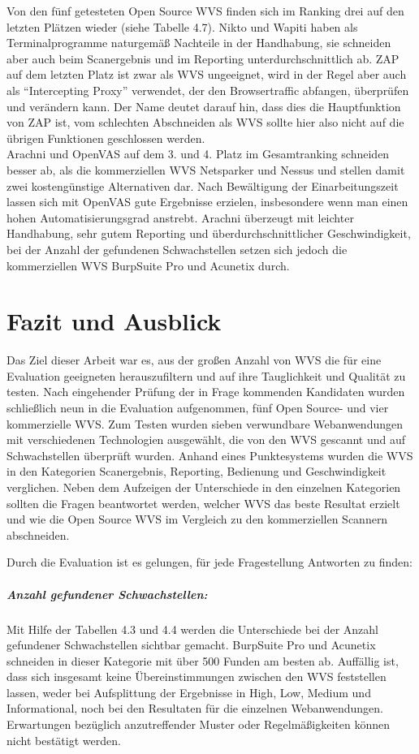 \documentclass[12pt,oneside,a4paper,parskip,pointlessnumbers]{scrbook}
\begin{document}
  Von den fünf getesteten Open Source WVS finden sich im Ranking drei auf den letzten Plätzen wieder (siehe Tabelle 4.7). Nikto und Wapiti haben als Terminalprogramme naturgemäß Nachteile in der Handhabung, sie schneiden aber auch beim Scanergebnis und im Reporting unterdurchschnittlich ab. ZAP auf dem letzten Platz ist zwar als WVS ungeeignet, wird in der Regel aber auch als ``Intercepting Proxy'' verwendet, der den Browsertraffic abfangen, überprüfen und verändern kann. Der Name deutet darauf hin, dass dies die Hauptfunktion von ZAP ist, vom schlechten Abschneiden als WVS sollte hier also nicht auf die übrigen Funktionen geschlossen werden.\\
  Arachni und OpenVAS auf dem 3. und 4. Platz im Gesamtranking schneiden besser ab, als die kommerziellen WVS Netsparker und Nessus und stellen damit zwei kostengünstige Alternativen dar. Nach Bewältigung der Einarbeitungszeit lassen sich mit OpenVAS gute Ergebnisse erzielen, insbesondere wenn man einen hohen Automatisierungsgrad anstrebt.
  Arachni überzeugt mit leichter Handhabung, sehr gutem Reporting und überdurchschnittlicher Geschwindigkeit, bei der Anzahl der gefundenen Schwachstellen setzen sich jedoch die kommerziellen WVS BurpSuite Pro und Acunetix durch.


\chapter{Fazit und Ausblick}
Das Ziel dieser Arbeit war es, aus der großen Anzahl von WVS die für eine Evaluation geeigneten herauszufiltern und auf ihre Tauglichkeit und Qualität zu testen. Nach eingehender Prüfung der in Frage kommenden Kandidaten wurden schließlich neun in die Evaluation aufgenommen, fünf Open Source- und vier kommerzielle WVS.
Zum Testen wurden sieben verwundbare Webanwendungen mit verschiedenen Technologien ausgewählt, die von den WVS gescannt und auf Schwachstellen überprüft wurden. Anhand eines Punktesystems wurden die WVS in den Kategorien Scanergebnis, Reporting, Bedienung und Geschwindigkeit verglichen.
Neben dem Aufzeigen der Unterschiede in den einzelnen Kategorien sollten die Fragen beantwortet werden, welcher WVS das beste Resultat erzielt und wie die Open Source WVS im Vergleich zu den kommerziellen Scannern abschneiden.

Durch die Evaluation ist es gelungen, für jede Fragestellung Antworten zu finden:
\paragraph{Anzahl gefundener Schwachstellen:}
Mit Hilfe der Tabellen 4.3 und 4.4 werden die Unterschiede bei der Anzahl gefundener Schwachstellen sichtbar gemacht. BurpSuite Pro und Acunetix schneiden in dieser Kategorie mit über 500 Funden am besten ab. Auffällig ist, dass sich insgesamt keine Übereinstimmungen zwischen den WVS feststellen lassen, weder bei Aufsplittung der Ergebnisse in High, Low, Medium und Informational, noch bei den Resultaten für die einzelnen Webanwendungen. Erwartungen bezüglich anzutreffender Muster oder Regelmäßigkeiten können nicht bestätigt werden.
\end{document}
